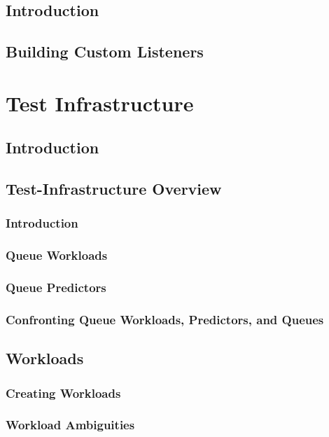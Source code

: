 \documentclass[12pt]{book}
\begin{document}
\section{Introduction}

\section{Building Custom Listeners}

\chapter{Test Infrastructure}

\section{Introduction}

\section{Test-Infrastructure Overview}

\subsection{Introduction}

\subsection{Queue Workloads}

\subsection{Queue Predictors}

\subsection{Confronting Queue Workloads, Predictors, and Queues}

\section{Workloads}

\subsection{Creating Workloads}

\subsection{Workload Ambiguities}
\end{document}

